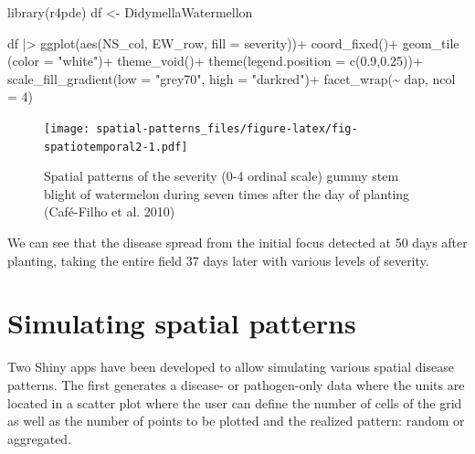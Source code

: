 \documentclass[
  letterpaper,
]{book}
\newenvironment{Shaded}{\begin{snugshade}}{\end{snugshade}}
\newcommand{\AttributeTok}[1]{\textcolor[rgb]{0.40,0.45,0.13}{#1}}
\newcommand{\DecValTok}[1]{\textcolor[rgb]{0.68,0.00,0.00}{#1}}
\newcommand{\FloatTok}[1]{\textcolor[rgb]{0.68,0.00,0.00}{#1}}
\newcommand{\FunctionTok}[1]{\textcolor[rgb]{0.28,0.35,0.67}{#1}}
\newcommand{\NormalTok}[1]{\textcolor[rgb]{0.00,0.23,0.31}{#1}}
\newcommand{\OtherTok}[1]{\textcolor[rgb]{0.00,0.23,0.31}{#1}}
\newcommand{\SpecialCharTok}[1]{\textcolor[rgb]{0.37,0.37,0.37}{#1}}
\newcommand{\StringTok}[1]{\textcolor[rgb]{0.13,0.47,0.30}{#1}}
\begin{document}
\begin{Shaded}
\begin{Highlighting}[]
\FunctionTok{library}\NormalTok{(r4pde)}
\NormalTok{df }\OtherTok{\textless{}{-}}\NormalTok{ DidymellaWatermellon }

\NormalTok{df }\SpecialCharTok{|\textgreater{}} 
  \FunctionTok{ggplot}\NormalTok{(}\FunctionTok{aes}\NormalTok{(NS\_col, EW\_row, }\AttributeTok{fill =}\NormalTok{ severity))}\SpecialCharTok{+}
  \FunctionTok{coord\_fixed}\NormalTok{()}\SpecialCharTok{+}
  \FunctionTok{geom\_tile}\NormalTok{ (}\AttributeTok{color =} \StringTok{"white"}\NormalTok{)}\SpecialCharTok{+}
  \FunctionTok{theme\_void}\NormalTok{()}\SpecialCharTok{+}
  \FunctionTok{theme}\NormalTok{(}\AttributeTok{legend.position =} \FunctionTok{c}\NormalTok{(}\FloatTok{0.9}\NormalTok{,}\FloatTok{0.25}\NormalTok{))}\SpecialCharTok{+}
 \FunctionTok{scale\_fill\_gradient}\NormalTok{(}\AttributeTok{low =} \StringTok{"grey70"}\NormalTok{, }\AttributeTok{high =} \StringTok{"darkred"}\NormalTok{)}\SpecialCharTok{+}
  \FunctionTok{facet\_wrap}\NormalTok{(}\SpecialCharTok{\textasciitilde{}}\NormalTok{ dap, }\AttributeTok{ncol =} \DecValTok{4}\NormalTok{)}
\end{Highlighting}
\end{Shaded}

\begin{figure}

\texttt{[image: spatial-patterns\_files/figure-latex/fig-spatiotemporal2-1.pdf]} \hfill{}

\caption{\label{fig-spatiotemporal2}Spatial patterns of the severity
(0-4 ordinal scale) gummy stem blight of watermelon during seven times
after the day of planting (Café-Filho et al. 2010)}

\end{figure}

We can see that the disease spread from the initial focus detected at 50
days after planting, taking the entire field 37 days later with various
levels of severity.

\hypertarget{simulating-spatial-patterns}{%
\section{Simulating spatial
patterns}\label{simulating-spatial-patterns}}

Two Shiny apps have been developed to allow simulating various spatial
disease patterns. The first generates a disease- or pathogen-only data
where the units are located in a scatter plot where the user can define
the number of cells of the grid as well as the number of points to be
plotted and the realized pattern: random or aggregated.
\end{document}
